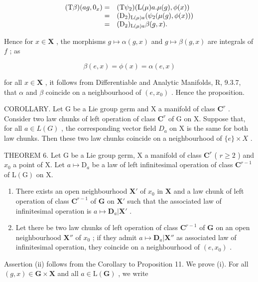 \[
\begin{array}{r l} (\mathrm{T} \beta) (a g, 0 _ {x}) = & (\mathrm{T} \psi_ {2}) (\mathrm{L} (\mu) a. \mu (g), \phi (x)) \\ = & (\mathrm{D} _ {2}) _ {\mathrm{L} (\mu) a} (\psi_ {2} (\mu (g), \phi (x))) \\ = & (\mathrm{D} _ {2}) _ {\mathrm{L} (\mu) a} \beta (g, x). \end{array}
\]

Hence for \(x \in \mathbf{X}\) , the morphisms \(g \mapsto \alpha(g, x)\) and \(g \mapsto \beta(g, x)\) are integrals of \(f\) ; as

\[
\beta (e, x) = \phi (x) = \alpha (e, x)
\]

for all \(x \in \mathbf{X}\) , it follows from Differentiable and Analytic Manifolds, R, 9.3.7, that \(\alpha\) and \(\beta\) coincide on a neighbourhood of \((e, x_0)\) . Hence the proposition.

COROLLARY. Let G be a Lie group germ and X a manifold of class \(\mathbf{C}^{r}\) . Consider two law chunks of left operation of class \(\mathbf{C}^{r}\) of G on X. Suppose that, for all \(a \in L(G)\) , the corresponding vector field \(D_{a}\) on X is the same for both law chunks. Then these two law chunks coincide on a neighbourhood of \(\{e\} \times X\) .

THEOREM 6. Let G be a Lie group germ, X a manifold of class \(\mathbf{C}^r\) ( \(r \geqslant 2\) ) and \(x_0\) a point of X. Let \(a \mapsto \mathrm{D}_a\) be a law of left infinitesimal operation of class \(\mathbf{C}^{r-1}\) of \(\mathrm{L(G)}\) on X.

\begin{enumerate}
\def\labelenumi{(\roman{enumi})}
\item
  There exists an open neighbourhood \(\mathbf{X}'\) of \(x_0\) in \(\mathbf{X}\) and a law chunk of left operation of class \(\mathbf{C}^{r-1}\) of \(\mathbf{G}\) on \(\mathbf{X}'\) such that the associated law of infinitesimal operation is \(a \mapsto \mathbf{D}_a|\mathbf{X}'\) .
\item
  Let there be two law chunks of left operation of class \(\mathbf{C}^{r-1}\) of \(\mathbf{G}\) on an open neighbourhood \(\mathbf{X}''\) of \(x_0\) ; if they admit \(a \mapsto \mathbf{D}_a|\mathbf{X}''\) as associated law of infinitesimal operation, they coincide on a neighbourhood of \((e, x_0)\) .
\end{enumerate}

Assertion (ii) follows from the Corollary to Proposition 11. We prove (i). For all \((g, x) \in \mathbf{G} \times \mathbf{X}\) and all \(a \in \mathrm{L}(\mathbf{G})\) , we write

